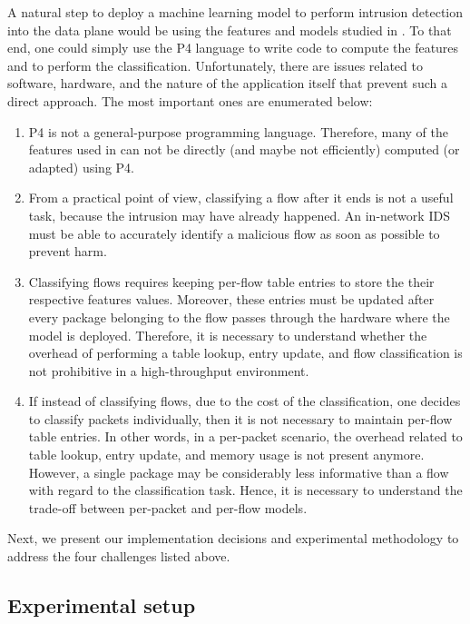 A natural step to deploy a machine learning model to perform intrusion detection into the data plane would be using the features and models studied in \cite{sharafaldin2018toward}. To that end, one could simply use the P4 language to write code to compute the features and to perform the classification. Unfortunately, there are issues related to software, hardware, and the nature of the application itself that prevent such a direct approach. The most important ones are enumerated below: 
\begin{enumerate}
    \item P4 is not a general-purpose programming language. Therefore, many of the features used in \cite{sharafaldin2018toward} can not be directly (and maybe not efficiently) computed (or adapted) using P4. \label{question:feature}
    \item From a practical point of view, classifying a flow after it ends is not a useful task, because the intrusion may have already happened. An in-network IDS must be able to accurately identify a malicious flow as soon as possible to prevent harm.\label{question:early}
    \item Classifying flows requires keeping per-flow table entries to store the their respective features values. Moreover, these entries must be updated after every package belonging to the flow passes through the hardware where the model is deployed. Therefore, it is necessary to understand whether the overhead of performing a table lookup, entry update, and flow classification is not prohibitive in a high-throughput environment.\label{question:perf}
    \item If instead of classifying flows, due to the cost of the classification, one decides to classify packets individually, then it is not necessary to maintain per-flow table entries. In other words, in a per-packet scenario, the overhead related to table lookup, entry update, and memory usage is not present anymore. However, a single package may be considerably less informative than a flow with regard to the classification task. Hence, it is necessary to understand the trade-off between per-packet and per-flow models.   \label{question:packets}
\end{enumerate}
Next, we present our implementation decisions and experimental methodology to address the four challenges listed above.

\subsection{Experimental setup}\label{sub:expset}

